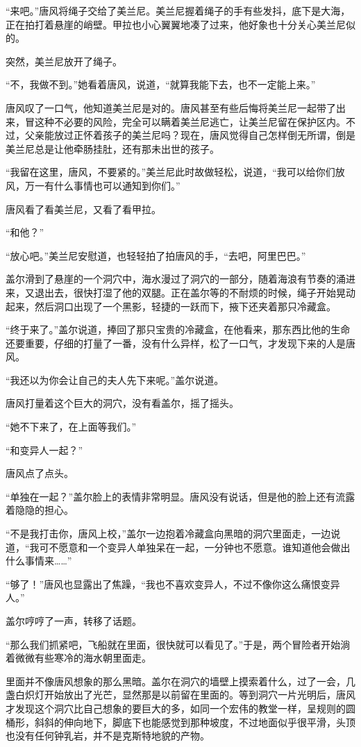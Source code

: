“来吧。”唐风将绳子交给了美兰尼。美兰尼握着绳子的手有些发抖，底下是大海，正在拍打着悬崖的峭壁。甲拉也小心翼翼地凑了过来，他好象也十分关心美兰尼似的。

突然，美兰尼放开了绳子。

“不，我做不到。”她看着唐风，说道，“就算我能下去，也不一定能上来。”

唐风叹了一口气，他知道美兰尼是对的。唐风甚至有些后悔将美兰尼一起带了出来，冒这种不必要的风险，完全可以瞒着美兰尼逃亡，让美兰尼留在保护区内。不过，父亲能放过正怀着孩子的美兰尼吗？现在，唐风觉得自己怎样倒无所谓，倒是美兰尼总是让他牵肠挂肚，还有那未出世的孩子。

“我留在这里，唐风，不要紧的。”美兰尼此时故做轻松，说道，“我可以给你们放风，万一有什么事情也可以通知到你们。”

唐风看了看美兰尼，又看了看甲拉。

“和他？”

“放心吧。”美兰尼安慰道，也轻轻拍了拍唐风的手，“去吧，阿里巴巴。”

盖尔滑到了悬崖的一个洞穴中，海水漫过了洞穴的一部分，随着海浪有节奏的涌进来，又退出去，很快打湿了他的双腿。正在盖尔等的不耐烦的时候，绳子开始晃动起来，然后洞口出现了一个黑影，轻捷的一跃而下，掖下还夹着那只冷藏盒。

“终于来了。”盖尔说道，捧回了那只宝贵的冷藏盒，在他看来，那东西比他的生命还要重要，仔细的打量了一番，没有什么异样，松了一口气，才发现下来的人是唐风。

“我还以为你会让自己的夫人先下来呢。”盖尔说道。

唐风打量着这个巨大的洞穴，没有看盖尔，摇了摇头。

“她不下来了，在上面等我们。”

“和变异人一起？”

唐风点了点头。

“单独在一起？”盖尔脸上的表情非常明显。唐风没有说话，但是他的脸上还有流露着隐隐的担心。

“不是我打击你，唐风上校，”盖尔一边抱着冷藏盒向黑暗的洞穴里面走，一边说道，“我可不愿意和一个变异人单独呆在一起，一分钟也不愿意。谁知道他会做出什么事情来……”

“够了！”唐风也显露出了焦躁，“我也不喜欢变异人，不过不像你这么痛恨变异人。”

盖尔哼哼了一声，转移了话题。

“那么我们抓紧吧，飞船就在里面，很快就可以看见了。”于是，两个冒险者开始淌着微微有些寒冷的海水朝里面走。

里面并不像唐风想象的那么黑暗。盖尔在洞穴的墙壁上摸索着什么，过了一会，几盏白炽灯开始放出了光芒，显然那是以前留在里面的。等到洞穴一片光明后，唐风才发现这个洞穴比自己想象的要巨大的多，如同一个宏伟的教堂一样，呈规则的圆桶形，斜斜的伸向地下，脚底下也能感觉到那种坡度，不过地面似乎很平滑，头顶也没有任何钟乳岩，并不是克斯特地貌的产物。

